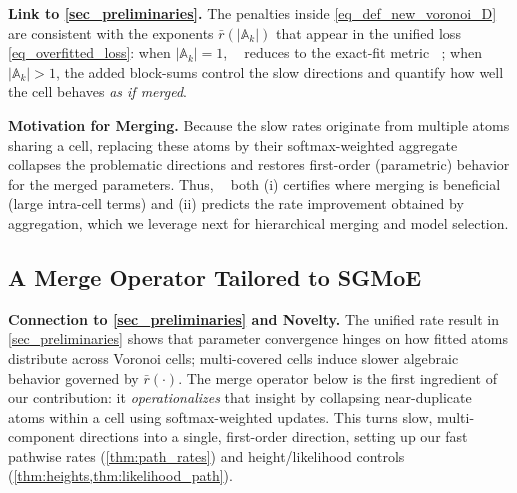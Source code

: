 \documentclass[twoside]{article}
\DeclareMathOperator*{\VDFRA}{D_{FRA}}
\DeclareMathOperator*{\VDE}{D_{E}}
\theoremstyle{plain}
\theoremstyle{definition}
\theoremstyle{plain}
\def\sA{{\mathbb{A}}}
\begin{document}
{\bf Link to \texorpdfstring{\cref{sec_preliminaries}}{Preliminaries}.}
The penalties inside \cref{eq_def_new_voronoi_D} are consistent with the exponents $\bar r(|\sA_k|)$ that appear in the unified loss \cref{eq_overfitted_loss}: when $|\sA_k|=1$, \(\VDFRA\) reduces to the exact-fit metric \(\VDE\); when $|\sA_k|>1$, the added block-sums control the slow directions and quantify how well the cell behaves \emph{as if merged}.

{\bf Motivation for Merging.} Because the slow rates originate from multiple atoms sharing a cell, replacing these atoms by their softmax-weighted aggregate collapses the problematic directions and restores first-order (parametric) behavior for the merged parameters. Thus, \(\VDFRA\) both (i) certifies where merging is beneficial (large intra-cell terms) and (ii) predicts the rate improvement obtained by aggregation, which we leverage next for hierarchical merging and model selection.

\subsection{A Merge Operator Tailored to SGMoE}
\label{subsec_merge_operator}

{\bf Connection to \cref{sec_preliminaries} and Novelty.}
The unified rate result in \cref{sec_preliminaries} shows that parameter convergence hinges on how fitted atoms distribute across Voronoi cells; multi-covered cells induce slower algebraic behavior governed by $\bar r(\cdot)$. The merge operator below is the first ingredient of our contribution: it \emph{operationalizes} that insight by collapsing near-duplicate atoms within a cell using softmax-weighted updates. This turns slow, multi-component directions into a single, first-order direction, setting up our fast pathwise rates (\cref{thm:path_rates}) and height/likelihood controls (\cref{thm:heights,thm:likelihood_path}).
\end{document}
